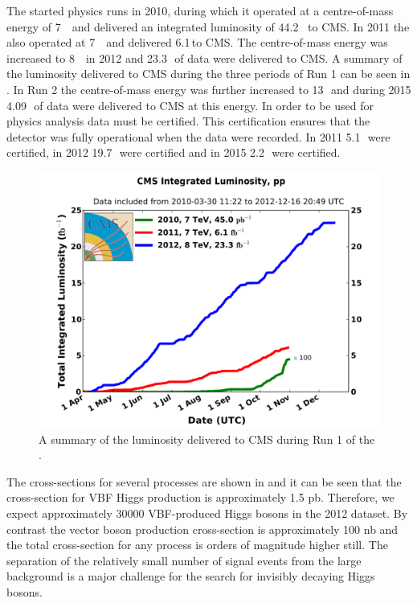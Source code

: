 The \LHC started physics runs in 2010, during which it operated at a centre-of-mass energy of 7\,\TeV~ and delivered an integrated luminosity of 44.2 \invpb ~to CMS. In 2011 the \LHC also operated at 7\,\TeV~ and delivered 6.1\,\invfb to CMS. The centre-of-mass energy was increased to 8\,\TeV~ in 2012 and 23.3\,\invfb~of data were delivered to CMS. A summary of the luminosity delivered to CMS during the three periods of Run 1 can be seen in . In Run 2 the centre-of-mass energy was further increased to 13\,\TeV~and during 2015 4.09\,\invfb~of data were delivered to CMS at this energy. In order to be used for physics analysis data must be certified. This certification ensures that the detector was fully operational when the data were recorded. In 2011 5.1\,\invfb~were certified, in 2012 19.7\,\invfb~were certified and in 2015 2.2\,\invfb~were certified.


\begin{figure}
  \includegraphics[width=1.2\largefigwidth]{plots/detector/int_lumi_cumulative_pp_2.pdf}
  \caption[A summary of the luminosity delivered to CMS during Run 1 of the \LHC.]{A summary of the luminosity delivered to CMS during Run 1 of the \LHC \cite{CMSLumiPublic}.}
  \label{fig:lumisummary}
\end{figure}

The cross-sections for several processes are shown in  and it can be seen that the cross-section for VBF Higgs production is approximately 1.5 pb. Therefore, we expect approximately 30000 VBF-produced Higgs bosons in the 2012 dataset. By contrast the vector boson production cross-section is approximately 100 nb and the total cross-section for any process is orders of magnitude higher still. The separation of the relatively small number of signal events from the large background is a major challenge for the search for invisibly decaying Higgs bosons.

